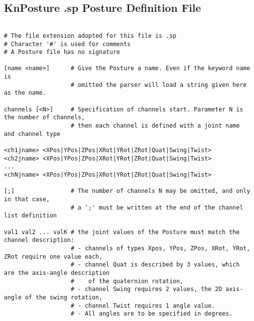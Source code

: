 \subsection{KnPosture .sp Posture Definition File}

\begin{lstlisting}[title={}]

# The file extension adopted for this file is .sp
# Character '#' is used for comments
# A Posture file has no signature

[name <name>]      # Give the Posture a name. Even if the keyword name is
                   # omitted the parser will load a string given here as the name.

channels [<N>]     # Specification of channels start. Parameter N is the number of channels,
                   # then each channel is defined with a joint name and channel type

<ch1jname> <XPos|YPos|ZPos|XRot|YRot|ZRot|Quat|Swing|Twist>
<ch2jname> <XPos|YPos|ZPos|XRot|YRot|ZRot|Quat|Swing|Twist>
...
<chNjname> <XPos|YPos|ZPos|XRot|YRot|ZRot|Quat|Swing|Twist>

[;]                # The number of channels N may be omitted, and only in that case, 
                   # a ';' must be written at the end of the channel list definition

val1 val2 ... valK # the joint values of the Posture must match the channel description:
                   # - channels of types Xpos, YPos, ZPos, XRot, YRot, ZRot require one value each,
                   # - channel Quat is described by 3 values, which are the axis-angle description
                   #    of the quaternion rotation,
                   # - channel Swing requires 2 values, the 2D axis-angle of the swing rotation,
                   # - channel Twist requires 1 angle value.
                   # - All angles are to be specified in degrees.

\end{lstlisting}
